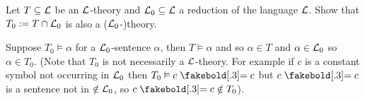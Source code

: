 \bexerc

    Let $T\subseteq{\cal L}$ be an ${\cal L}$-theory and ${\cal L}_0\subseteq{\cal L}$ a reduction of the language ${\cal L}$.
    Show that $T_0\coloneqq T\cap{\cal L}_0$ is also a (${\cal L}_0$-)theory.

\eexerc

Suppose $T_0\vDash\alpha$ for a ${\cal L}_0$-sentence $\alpha$, then $T\vDash\alpha$ and so $\alpha\in T$ and $\alpha\in{\cal L}_0$ so $\alpha\in T_0$.
(Note that $T_0$ is not necessarily a ${\cal L}$-theory.
For example if $c$ is a constant symbol not occurring in ${\cal L}_0$ then $T_0\vDash c\eq c$ but $c\eq c$ is a sentence not in $\notin{\cal L}_0$, so $c\eq c\notin T_0$).

